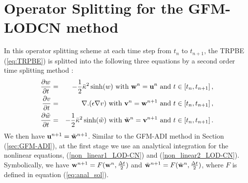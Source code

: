 \section{Operator Splitting for the GFM-LODCN method}
\label{sec:GFM-LODCN}
In this operator splitting scheme at each time step from $t_n$ to $t_{n+1}$, the TRPBE (\ref{eq:TRPBE}) is splitted into the following three equations by a second order time splitting method \cite{Yu2005}:
\begin{eqnarray}
  \frac{\partial w}{\partial t}&=& -\frac{1}{2}\bar\kappa^2 \sinh(w) \text{ with } {\bf w}^n={\bf u}^n\text{ and } t \in \left[t_n,t_{n+1}\right],\label{non_linear1_LOD-CN}\\
 \frac{\partial v}{\partial t}&=&  \nabla . (\epsilon\nabla v) \text{    with } {\bf v}^n={\bf w}^{n+1}\text{ and } t \in \left[t_n,t_{n+1}\right],	 \label{diffusion_LOD-CN}\\
 \frac{\partial \tilde{w}}{\partial t}&=& -\frac{1}{2}\bar\kappa^2 \sinh( \tilde{w}) \text{ with } \tilde{\bf w}^n={\bf v}^{n+1}\text{ and } t \in \left[t_n,t_{n+1}\right].\label{non_linear2_LOD-CN}
\end{eqnarray}
We then have ${\bf u}^{n+1}=\tilde{\bf w}^{n+1}$. Similar to the GFM-ADI method in Section (\ref{sec:GFM-ADI}), at the first stage we use an analytical integration for the nonlinear equations, (\ref{non_linear1_LOD-CN}) and (\ref{non_linear2_LOD-CN}). Symbolically, we have ${\bf w}^{n+1}=F({\bf w}^n,\frac{\Delta t}{2})$ and $\tilde{\bf w}^{n+1}=F(\tilde{\bf w}^n,\frac{\Delta t}{2})$, where $F$ is defined in equation (\ref{eq:anal_sol}).


